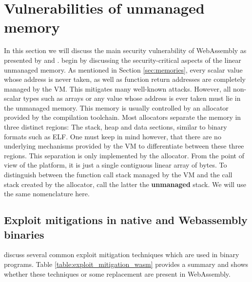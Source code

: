 \documentclass[sigconf]{acmart}
\begin{document}
\section{Vulnerabilities of unmanaged memory}
\label{sec:binary_vulns}
In this section we will discuss the main security vulnerability of WebAssembly as presented by \citet{mcfadden_security_2018} and \citet{lehmann_everything_2020}. \citet{lehmann_everything_2020} begin by discussing the security-critical aspects of the linear unmanaged memory. As mentioned in Section \ref{sec:memories}, every scalar value whose address is never taken, as well as function return addresses are completely managed by the VM. This mitigates many well-known attacks. However, all non-scalar types such as arrays or any value whose address is ever taken must lie in the unmanaged memory. This memory is usually controlled by an allocator provided by the compilation toolchain. Most allocators separate the memory in three distinct regions: The stack, heap and data sections, similar to binary formats such as ELF. One must keep in mind however, that there are no underlying mechanisms provided by the VM to differentiate between these three regions. This separation is only implemented by the allocator. From the point of view of the platform, it is just a single contiguous linear array of bytes. 
To distinguish between the function call stack managed by the VM and the call stack created by the allocator, \citet{lehmann_everything_2020} call the latter the \textbf{unmanaged} stack. We will use the same nomenclature here. 

\subsection{Exploit mitigations in native and Webassembly binaries}
\citet{mcfadden_security_2018} discuss several common exploit mitigation techniques which are used in binary programs. Table \ref{table:exploit_mitigation_wasm} provides a summary and shows whether these techniques or some replacement are present in WebAssembly. 
\end{document}
